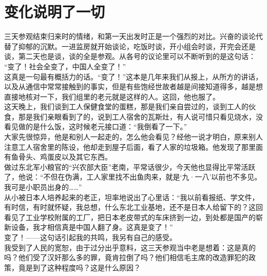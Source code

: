 \fancyhead[RO]{} %
\fancyhead[LE]{} %
\chapter*{变化说明了一切}
\thispagestyle{empty}
三天参观结束归来时的情绪，和第一天出发时正是一个强烈的对比。兴奋的谈论代替了抑郁的沉默。一进监房就开始谈论，吃饭时谈，开小组会时谈，开完会还是谈，第二天也是谈，谈的全是参观。从各号的议论里可以不断听到的是这句话：\\

“变了！社会全变了，中国人全变了！”\\

这真是一句最有概括力的话。“变了！”这本是几年来我们从报上，从所方的讲话，以及从通信中常常接触到的事实，但是有些饱经世故者越是间接知道得多，越是想直接地核对一下，我们组里的老元就是这样的人。这回，他也服了。\\

这天晚上，我们谈到工人保健食堂的蛋糕，那是我们亲自尝过的，谈到工人的伙食，那是我们亲眼看到了的，说到工人宿舍的瓦斯灶，有人说可惜只看见烧水，没看见做的是什么饭，这时候老元接口道：“我倒看了一下。”\\

大家先很惊异，他是和别人一起走的，怎么他会看见？经他一说才明白，原来别人注意工人宿舍里的陈设，他却走到屋子后面，看了人家的垃圾箱。他发现了那里面有鱼骨头、鸡蛋皮以及其它东西。\\

做过东北军小粮官的“兴农部大臣”老南，平常话很少，今天他也显得比平常活跃了，他说：“不但在伪满，工人家里找不出鱼肉来，就是‘九·一八’以前也不多见。我可是小职员出身的……”\\

从小被日本人培养起来的老正，坦率地说出了心里话：“我以前看报纸、学文件，有时信，有时就怀疑，我总想，什么东北工业基地，还不是日本人给留下的？这回看见了工业学校附属的工厂，把日本老皮带式的车床挤到一边，到处都是国产的崭新设备，我才相信真是中国人翻了身。这真是变了！”\\

变了！——这句话引起我的共鸣，我另有自己的感受。\\

我受到了人民的宽恕，由于过分出乎意料，这三天参观当中老是想着：这是真的吗？他们受了汉奸那么多的罪，竟肯拉倒了吗？他们相信毛主席的改造罪犯的政策，竟是到了这种程度吗？这是什么原因？\\

